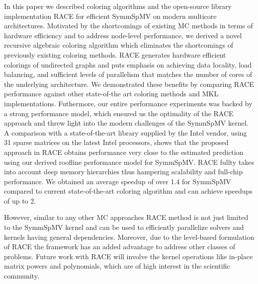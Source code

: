In this paper we described coloring algorithms and the 
open-source library implementation \acrshort{RACE} for efficient \acrfull{SymmSpMV} on
modern multicore  architectures. Motivated by the shortcomings of existing \acrshort{MC} methods in  terms of hardware efficiency 
and to address node-level performance, we derived a novel recursive algebraic  coloring algorithm 
which eliminates the shortcomings of previously existing coloring methods.
\acrshort{RACE} generates hardware efficient \DK colorings of undirected graphs and puts 
emphasis on achieving data locality, load balancing, and sufficient levels of parallelism that matches the 
number of cores  of the underlying architecture. 
We demonstrated these benefits by comparing \acrshort{RACE} performance against other state-of-the art
coloring methods and  \acrshort{MKL} implementations. Futhermore, our entire performance experiments
was backed by a strong performance model,  which ensured us the optimality of the \acrshort{RACE} approach
and threw light into the modern challenges  of the \acrshort{SymmSpMV} kernel.
A comparison with a state-of-the-art library  supplied by the Intel vendor, using 31 sparse matrices 
on the latest Intel  processors, shows that the proposed approach in \acrshort{RACE}
obtains performance very close to the estimated prediction using our derived roofline performance model for 
\acrfull{SymmSpMV}. \acrshort{RACE} fullty takes into account  deep memory hierarchies thus 
hampering scalability and full-chip performance.
 We obtained an average speedup of over 1.4 for \acrshort{SymmSpMV} compared to current 
state-of-the-art  coloring algorithm and can achieve speedups of up to 2.




However, similar to any other \acrshort{MC} approaches \acrshort{RACE} method 
is not just limited to the \acrshort{SymmSpMV} kernel
and can be used to efficiently parallelize solvers and kernels 
having general \DK dependencies. Moreover, due to the level-based formulation
of \acrshort{RACE} the framework has an added advantage to address 
other classes of problems. Future work with \acrshort{RACE} will involve the
kernel operations like in-place matrix powers and polynomials, which are of 
high interest in the scientific community. 



